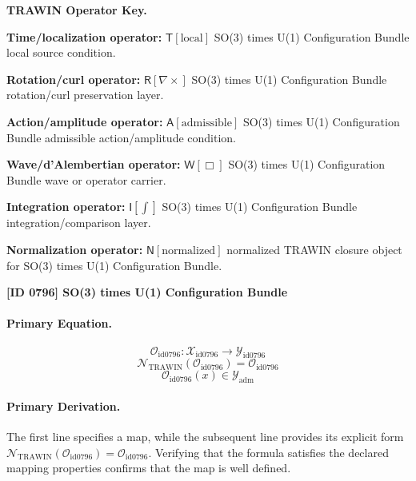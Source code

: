 \par\vspace{0.45\baselineskip}
\noindent\begin{minipage}[t]{\linewidth}
\begingroup
\small
\raggedright
\textbf{TRAWIN Operator Key.}\par
\noindent\textbf{Time/localization operator:} $\mathsf{T}\!\left[\mathrm{local}\right]$ SO(3) times U(1) Configuration Bundle local source condition.\par
\noindent\textbf{Rotation/curl operator:} $\mathsf{R}\!\left[\nabla\times\right]$ SO(3) times U(1) Configuration Bundle rotation/curl preservation layer.\par
\noindent\textbf{Action/amplitude operator:} $\mathsf{A}\!\left[\mathrm{admissible}\right]$ SO(3) times U(1) Configuration Bundle admissible action/amplitude condition.\par
\noindent\textbf{Wave/d'Alembertian operator:} $\mathsf{W}\!\left[\Box\right]$ SO(3) times U(1) Configuration Bundle wave or operator carrier.\par
\noindent\textbf{Integration operator:} $\mathsf{I}\!\left[\int\right]$ SO(3) times U(1) Configuration Bundle integration/comparison layer.\par
\noindent\textbf{Normalization operator:} $\mathsf{N}\!\left[\mathrm{normalized}\right]$ normalized TRAWIN closure object for SO(3) times U(1) Configuration Bundle.\par
\endgroup
\end{minipage}

\clearpage
\noindent\textbf{[ID 0796] SO(3) times U(1) Configuration Bundle}\par
\vspace{0.35em}
\paragraph{Primary Equation.}
\[
\mathcal{O}_{\mathrm{id0796}}:\mathcal{X}_{\mathrm{id0796}}\longrightarrow\mathcal{Y}_{\mathrm{id0796}}
\]
\[
\mathcal{N}_{\mathrm{TRAWIN}}(\mathcal{O}_{\mathrm{id0796}})=\mathcal{O}_{\mathrm{id0796}}
\]
\[
\mathcal{O}_{\mathrm{id0796}}(x)\in\mathcal{Y}_{\mathrm{adm}}
\]

\paragraph{Primary Derivation.}
The first line specifies a map, while the subsequent line provides its explicit form \( \mathcal{N}_{\mathrm{TRAWIN}}(\mathcal{O}_{\mathrm{id0796}})=\mathcal{O}_{\mathrm{id0796}} \). Verifying that the formula satisfies the declared mapping properties confirms that the map is well defined.
